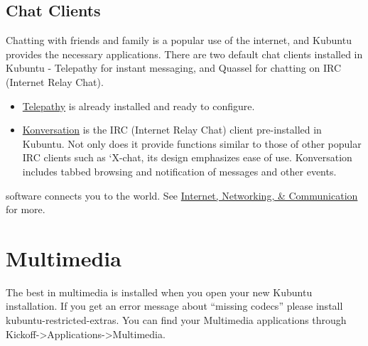 \documentclass[letterpaper,10pt,english]{sphinxmanual}
\begin{document}
\subsection{Chat Clients}
\label{\detokenize{docs/software:chat-clients}}
Chatting with friends and family is a popular use of the internet, and Kubuntu provides the necessary applications. There are two default chat clients installed in Kubuntu -  Telepathy for instant messaging, and Quassel for chatting on IRC (Internet Relay Chat).
\begin{itemize}
\item {} 
 \href{https://userbase.kde.org/Special:MyLanguage/Telepathy}{Telepathy} is already installed and ready to configure.

\item {} 
\href{https://userbase.kde.org/Special:MyLanguage/Konversation}{Konversation} is the IRC (Internet Relay Chat) client pre-installed in Kubuntu. Not only does it provide functions similar to those of other popular IRC clients such as `X-chat, its design emphasizes ease of use. Konversation includes tabbed browsing and notification of messages and other events.

\end{itemize}

 software connects you to the world. See \href{https://userbase.kde.org/Special:MyLanguage/Applications/Internet}{Internet, Networking, \& Communication} for more.


\section{Multimedia}
\label{\detokenize{docs/software:multimedia}}
The best in multimedia is installed when you open your new Kubuntu installation. If you get an error message about ``missing codecs'' please install kubuntu-restricted-extras. You can find your Multimedia applications through Kickoff-\textgreater{}Applications-\textgreater{}Multimedia.
\end{document}
